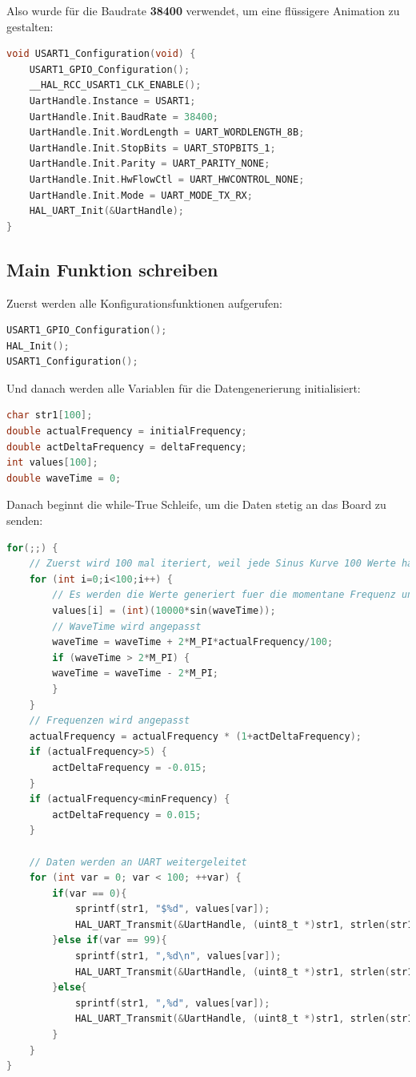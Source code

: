 Also wurde für die Baudrate \textbf{38400} verwendet, um eine flüssigere Animation zu gestalten:

\begin{lstlisting}[language=c]
void USART1_Configuration(void) {
	USART1_GPIO_Configuration();
	__HAL_RCC_USART1_CLK_ENABLE();
	UartHandle.Instance = USART1;
	UartHandle.Init.BaudRate = 38400;
	UartHandle.Init.WordLength = UART_WORDLENGTH_8B;
	UartHandle.Init.StopBits = UART_STOPBITS_1;
	UartHandle.Init.Parity = UART_PARITY_NONE;
	UartHandle.Init.HwFlowCtl = UART_HWCONTROL_NONE;
	UartHandle.Init.Mode = UART_MODE_TX_RX;
	HAL_UART_Init(&UartHandle);
}
\end{lstlisting}

\subsection{Main Funktion schreiben}
Zuerst werden alle Konfigurationsfunktionen aufgerufen:

\begin{lstlisting}[language=C]
USART1_GPIO_Configuration();
HAL_Init();
USART1_Configuration();
\end{lstlisting}

Und danach werden alle Variablen für die Datengenerierung initialisiert:

\begin{lstlisting}[language=C]
char str1[100];
double actualFrequency = initialFrequency;
double actDeltaFrequency = deltaFrequency;
int values[100];
double waveTime = 0;
\end{lstlisting}

Danach beginnt die while-True Schleife, um die Daten stetig an das Board zu senden:
\begin{lstlisting}[language=C]
for(;;) {
	// Zuerst wird 100 mal iteriert, weil jede Sinus Kurve 100 Werte haben soll
	for (int i=0;i<100;i++) {
		// Es werden die Werte generiert fuer die momentane Frequenz und WaveTime
		values[i] = (int)(10000*sin(waveTime));
		// WaveTime wird angepasst
		waveTime = waveTime + 2*M_PI*actualFrequency/100;
		if (waveTime > 2*M_PI) {
		waveTime = waveTime - 2*M_PI;
		}
	}
	// Frequenzen wird angepasst
	actualFrequency = actualFrequency * (1+actDeltaFrequency);
	if (actualFrequency>5) {
		actDeltaFrequency = -0.015;
	}
	if (actualFrequency<minFrequency) {
		actDeltaFrequency = 0.015;
	}

	// Daten werden an UART weitergeleitet
	for (int var = 0; var < 100; ++var) {
		if(var == 0){
			sprintf(str1, "$%d", values[var]);
			HAL_UART_Transmit(&UartHandle, (uint8_t *)str1, strlen(str1), 5000);
		}else if(var == 99){
			sprintf(str1, ",%d\n", values[var]);
			HAL_UART_Transmit(&UartHandle, (uint8_t *)str1, strlen(str1), 5000);
		}else{
			sprintf(str1, ",%d", values[var]);
			HAL_UART_Transmit(&UartHandle, (uint8_t *)str1, strlen(str1), 5000);
		}
	}
}
\end{lstlisting}

